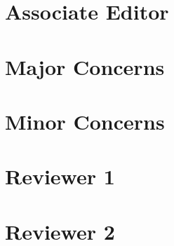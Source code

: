 \documentclass{response}
\begin{document}
\section{Associate Editor}

\begin{response}
\end{response}
\section{Major Concerns}

\begin{response}
\end{response}
\section{Minor Concerns}

\begin{response}
\end{response}
\section{Reviewer 1}
\section{Reviewer 2}
\printbibliography
\end{document}
